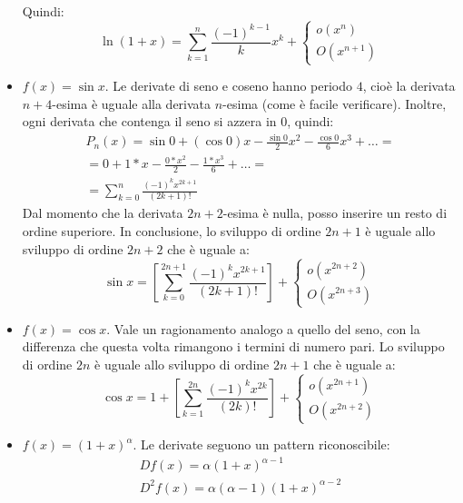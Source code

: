 \begin{itemize}
\[	      \]
	      Quindi:
	      \begin{equation}
		      \label{tay:ln}
		      \ln(1+x)=\sum_{k=1}^n\frac{(-1)^{k-1}}{k}x^k+\begin{cases}o(x^n)\\O(x^{n+1})\end{cases}
	      \end{equation}
	\item $f(x)=\sin x$. Le derivate di seno e coseno hanno periodo $4$, cioè la derivata $n+4$-esima è uguale alla derivata $n$-esima (come è facile verificare). Inoltre, ogni derivata che contenga il seno si azzera in $0$, quindi:
	      \begin{gather*}
		      P_n(x)=\sin 0+(\cos 0)x-\frac{\sin 0}{2}x^2-\frac{\cos 0}{6}x^3+\dots=\\
		      =0+1*x-\frac{0*x^2}{2}-\frac{1*x^3}{6}+\dots=\\
		      =\sum_{k=0}^n \frac{(-1)^k x^{2k+1}}{(2k+1)!}
	      \end{gather*}
	      Dal momento che la derivata $2n+2$-esima è nulla, posso inserire un resto di ordine superiore. In conclusione, lo sviluppo di ordine $2n+1$ è uguale allo sviluppo di ordine $2n+2$ che è uguale a:
	      \begin{equation}
		      \label{tay:sin}
		      \sin x=\left[\sum_{k=0}^{2n+1} \frac{(-1)^k x^{2k+1}}{(2k+1)!}\right]+\begin{cases}o(x^{2n+2})\\O(x^{2n+3})\end{cases}
	      \end{equation}
	\item $f(x)=\cos x$. Vale un ragionamento analogo a quello del seno, con la differenza che questa volta rimangono i termini di numero pari. Lo sviluppo di ordine $2n$ è uguale allo sviluppo di ordine $2n+1$ che è uguale a:
	      \begin{equation}
		      \label{tay:cos}
		      \cos x=1+\left[\sum_{k=1}^{2n} \frac{(-1)^k x^{2k}}{(2k)!}\right]+\begin{cases}o(x^{2n+1})\\O(x^{2n+2})\end{cases}
	      \end{equation}
	\item $f(x)=(1+x)^\alpha$. Le derivate seguono un pattern riconoscibile:
	      \begin{gather*}
		      Df(x)=\alpha(1+x)^{\alpha-1}\\
		      D^2f(x)=\alpha(\alpha-1)(1+x)^{\alpha-2}\\

\end{gather*}
\end{itemize}

